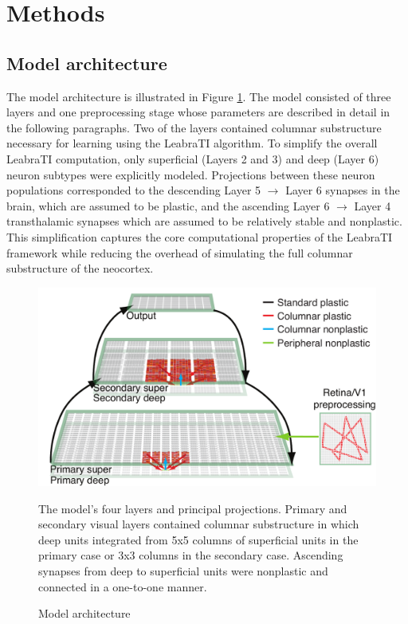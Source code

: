\documentclass[dwyatte_dissertation.tex]{subfiles}
\begin{document}
\section{Methods}

\subsection{Model architecture}

The model architecture is illustrated in Figure \ref{fig:v1_v2_output}. The model consisted of three layers and one preprocessing stage whose parameters are described in detail in the following paragraphs. Two of the layers contained columnar substructure necessary for learning using the LeabraTI algorithm. To simplify the overall LeabraTI computation, only superficial (Layers 2 and 3) and deep (Layer 6) neuron subtypes were explicitly modeled. Projections between these neuron populations corresponded to the descending Layer 5 $\rightarrow$ Layer 6 synapses in the brain, which are assumed to be plastic, and the ascending Layer 6 $\rightarrow$ Layer 4 transthalamic synapses which are assumed to be relatively stable and nonplastic. This simplification captures the core computational properties of the LeabraTI framework while reducing the overhead of simulating the full columnar substructure of the neocortex.

\begin{figure}[h!]
\begin{center}
\includegraphics[width=160mm]{figs/chap_sims/v1_v2_output_ti_annotated.pdf}
\end{center}
\caption{Model architecture}{The model's four layers and principal projections. Primary and secondary visual layers contained columnar substructure in which deep units integrated from 5x5 columns of superficial units in the primary case or 3x3 columns in the secondary case. Ascending synapses from deep to superficial units were nonplastic and connected in a one-to-one manner.}
\label{fig:v1_v2_output}
\end{figure}
\end{document}
